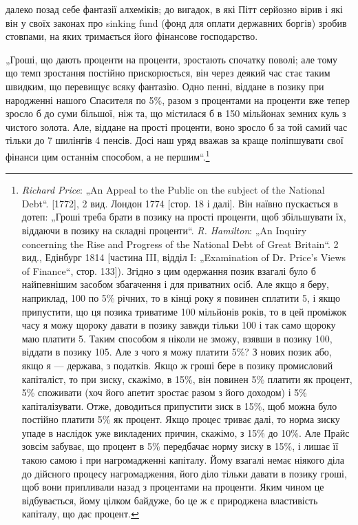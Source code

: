 \parcont{}  %
далеко позад себе фантазії алхеміків; до вигадок, в які Пітт
серйозно вірив і які він у своїх законах про sinking fund (фонд
для оплати державних боргів) зробив стовпами, на яких тримається
його фінансове господарство.

„Гроші, що дають проценти на проценти, зростають спочатку
поволі; але тому що темп зростання постійно прискорюється, він
через деякий час стає таким швидким, що перевищує всяку фантазію.
Одно пенні, віддане в позику при народженні нашого
Спасителя по 5\%, разом з процентами на проценти вже тепер
зросло б до суми більшої, ніж та, що містилася б в 150 мільйонах
земних куль з чистого золота. Але, віддане на прості проценти,
воно зросло б за той самий час тільки до 7 шилінгів 4 пенсів.
Досі наш уряд вважав за краще поліпшувати свої фінанси цим
останнім способом, а не першим“.\footnote{
\emph{Richard Price}: „An Appeal to the Public on the subject of the National Debt“.
[1772], 2 вид. Лондон 1774 [стор. 18 і далі]. Він наївно пускається в дотеп: „Гроші
треба брати в позику на прості проценти, щоб збільшувати їх, віддаючи в позику
на складні проценти“. \emph{R. Hamilton}: „An Inquiry concerning the Rise and
Progress of the National Debt of Great Britain“. 2 вид., Едінбург 1814 [частина III,
відділ I: „Examination of Dr. Price’s Views of Finance“, стор. 133]). Згідно з цим
одержання позик взагалі було б найпевнішим засобом збагачення і для приватних
осіб. Але якщо я беру, наприклад, 100 по 5\% річних,
то в кінці року я повинен сплатити 5, і якщо припустити, що
ця позика триватиме 100 мільйонів років, то в цей проміжок часу я можу щороку
давати в позику завжди тільки 100 і так само щороку маю платити
5. Таким способом я ніколи не зможу, взявши в позику
100, віддати в позику 105. Але з чого я можу
платити 5\%? З нових позик або, якщо я — держава, з податків. Якщо ж гроші
бере в позику промисловий капіталіст, то при зиску, скажімо, в 15\%, він повинен
5\% платити як процент, 5\% споживати (хоч його апетит зростає разом
з його доходом) і 5\% капіталізувати. Отже, доводиться припустити зиск в 15\%,
щоб можна було постійно платити 5\% як процент. Якщо процес триває далі, то
норма зиску упаде в наслідок уже викладених причин, скажімо, з 15\% до 10\%.
Але Прайс зовсім забуває, що процент в 5\% передбачає норму зиску в 15\%,
і лишає її такою самою і при нагромадженні капіталу. Йому взагалі немає ніякого
діла до дійсного процесу нагромадження, його діло тільки давати в позику
гроші, щоб вони припливали назад з процентами на проценти. Яким чином
це відбувається, йому цілком байдуже, бо це ж є природжена властивість
капіталу, що дає процент.
}

